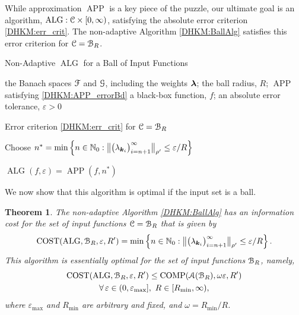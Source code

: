 \documentclass[USenglish]{article}
\theoremstyle{dgthm}
\newtheorem{theorem}{Theorem}
\theoremstyle{dgthm}
\theoremstyle{dgthm}
\theoremstyle{dgthm}
\theoremstyle{dgdef}
\theoremstyle{definition}
\DeclareMathOperator{\APP}{APP}
\DeclareMathOperator{\ALG}{ALG}
\DeclareMathOperator{\COST}{COST}
\DeclareMathOperator{\COMP}{COMP}
\newcommand{\bignorm}[2][{}]{\ensuremath{\bigl \lVert #2 \bigr \rVert}_{#1}}
\begin{document}
{While approximation $\APP$ is a key piece of the puzzle, our ultimate goal is an algorithm, $\ALG : \calC \times [0,\infty)$, satisfying the absolute error criterion \eqref{DHKM:err_crit}. The non-adaptive Algorithm \ref{DHKM:BallAlg} satisfies this error criterion for ${\mathcal{C}}  = {\mathcal{B}}_R$.  

\begin{algorithm}[H]
\caption{Non-Adaptive $\ALG$ for a Ball of Input Functions \label{DHKM:BallAlg}}
	\begin{algorithmic}
	\PARAM the Banach spaces ${\mathcal{F}}$ and ${\mathcal{G}}$, including the weights ${\boldsymbol{\lambda}}$; the ball radius, $R$; $\APP$ satisfying \eqref{DHKM:APP_errorBd}
	\INPUT a black-box function, $f$; an absolute error tolerance, $\varepsilon>0$

    \Ensure Error criterion \eqref{DHKM:err_crit} for ${\mathcal{C}} = {\mathcal{B}}_{R}$

    \State Choose $n^* =  \min \left \{n \in \N_0 : \bignorm[\rho']{\bigl(  \lambda_{\bsk_i}  \bigr)_{i = n+1}^{\infty}} \le \varepsilon /R \right \}$

    \RETURN $\ALG(f,\varepsilon) = \APP(f,n^*)$
\end{algorithmic}
\end{algorithm}
We now show that this algorithm is optimal if the input set is a ball.
\begin{theorem}\label{DHKM:thm_cost_non_adapt}
The non-adaptive Algorithm \ref{DHKM:BallAlg} has an information cost for the set of input functions ${\mathcal{C}} = {\mathcal{B}}_R$ that is given by
\[
\COST(\ALG, \calB_R, \varepsilon,R') = \min \left \{n \in \N_0 : \bignorm[\rho']{\bigl(  \lambda_{\bsk_i}  \bigr)_{i = n+1}^{\infty}} \le \varepsilon /R \right \}.
\]
This algorithm is essentially optimal for the set of input functions ${\mathcal{B}}_R$, namely,
\begin{multline*}
\COST(\ALG, \calB_R, \varepsilon,R') \le \COMP(\calA(\calB_R),\omega \varepsilon ,R') \\ \forall \, \varepsilon \in (0, \varepsilon_{\max}], \ R \in [R_{\min}, \infty),
\end{multline*}
where $\varepsilon_{\max}$ and $R_{\min}$ are arbitrary and fixed, and $\omega = R_{\min}/R$.
\end{theorem}

}
\end{document}
